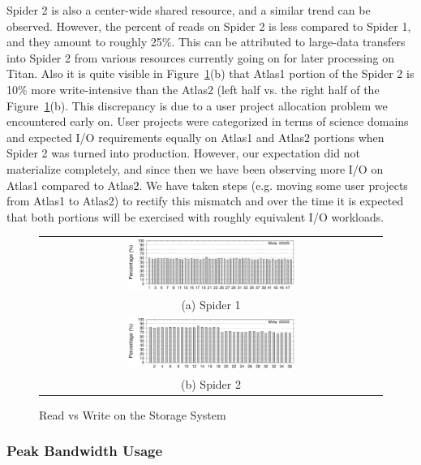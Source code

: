 Spider 2 is also a center-wide shared resource, and a similar trend can be
observed. However, the percent of reads on Spider 2 is less compared to Spider
1, and they amount to roughly 25\%. This can be attributed to large-data
transfers into Spider 2 from various resources currently going on for later
processing on Titan. Also it is quite visible in Figure~\ref{fig:rwratio}(b)
that Atlas1 portion of the Spider 2 is 10\% more write-intensive than the
Atlas2 (left half vs. the right half of the Figure~\ref{fig:rwratio}(b). This
discrepancy is due to a user project allocation problem we encountered early
on. User projects were categorized in terms of science domains and expected I/O
requirements equally on Atlas1 and Atlas2 portions when Spider 2 was turned
into production. However, our expectation did not materialize completely, and
since then we have been observing more I/O on Atlas1 compared to Atlas2. We
have taken steps (e.g. moving some user projects from Atlas1 to Atlas2) to
rectify this mismatch and over the time it is expected that both portions will
be exercised with roughly equivalent I/O workloads. 

\begin{figure}[!t]
\begin{center}
\begin{tabular}{c}
{\includegraphics[width=0.5\textwidth]{./figs/spider1-wr-ratio.eps}}\\
{(a) Spider 1}\\
{\includegraphics[width=0.5\textwidth]{./figs/spider2-wr-ratio.eps}}\\
{(b) Spider 2}\\
\end{tabular}
\vspace{-0.1in}
\caption{Read vs Write on the Storage System}
\label{fig:rwratio}
\end{center}
\end{figure}

\subsubsection{Peak Bandwidth Usage}


